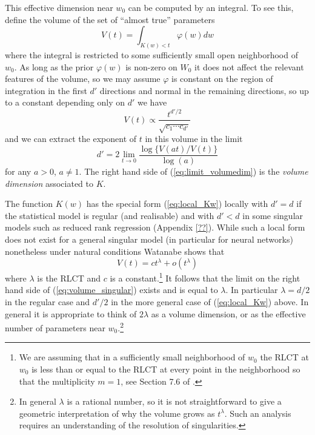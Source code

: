 \documentclass{article} %
\def\be{\begin{equation}}
\def\ee{\end{equation}}
\begin{document}
This effective dimension near $w_0$ can be computed by an integral. To see this, define the volume of the set of ``almost true'' parameters
\begin{equation}\label{eq:true_param}
V(t) = \int_{K(w) < t} \varphi(w) dw
\end{equation}
where the integral is restricted to some sufficiently small open neighborhood of $w_0$. As long as the prior $\varphi(w)$ is non-zero on $W_0$ it does not affect the relevant features of the volume, so we may assume $\varphi$ is constant on the region of integration in the first $d'$ directions and normal in the remaining directions, so up to a constant depending only on $d'$ we have
\begin{equation}\label{eq:volume_singular}
V(t) \propto \frac{t^{d'/2}}{\sqrt{c_1 \cdots c_{d'}}}
\end{equation}
and we can extract the exponent of $t$ in this volume in the limit
\be\label{eq:limit_volumedim}
d' = 2 \lim_{t \to 0} \frac{\log\big\{V(at)/V(t)\big\}}{\log(a)}
\ee
for any $a > 0$, $a \neq 1$. The right hand side of (\ref{eq:limit_volumedim}) is the \emph{volume dimension} associated to $K$. 

The function $K(w)$ has the special form (\ref{eq:local_Kw}) locally with $d' = d$ if the statistical model is regular (and realisable) and with $d' < d$ in some singular models such as reduced rank regression (Appendix \ref{??}). While such a local form does not exist for a general singular model (in particular for neural networks) nonetheless under natural conditions Watanabe shows that \citet[Theorem 7.1]{watanabe_algebraic_2009}
\[
V(t) = c t^\lambda + o( t^\lambda)
\]
where $\lambda$ is the RLCT and $c$ is a constant.\footnote{We are assuming that in a sufficiently small neighborhood of $w_0$ the RLCT at $w_0$ is less than or equal to the RLCT at every point in the neighborhood so that the multiplicity $m = 1$, see Section 7.6 of \citep{watanabe_algebraic_2009}.} It follows that the limit on the right hand side of  (\ref{eq:volume_singular}) exists and is equal to $\lambda$. In particular $\lambda = d/2$ in the regular case and $d'/2$ in the more general case of (\ref{eq:local_Kw}) above. In general it is appropriate to think of $2 \lambda$ as a volume dimension, or as the effective number of parameters near $w_0$.\footnote{In general $\lambda$ is a rational number, so it is not straightforward to give a geometric interpretation of why the volume grows as $t^\lambda$. Such an analysis requires an understanding of the resolution of singularities.}
\end{document}
